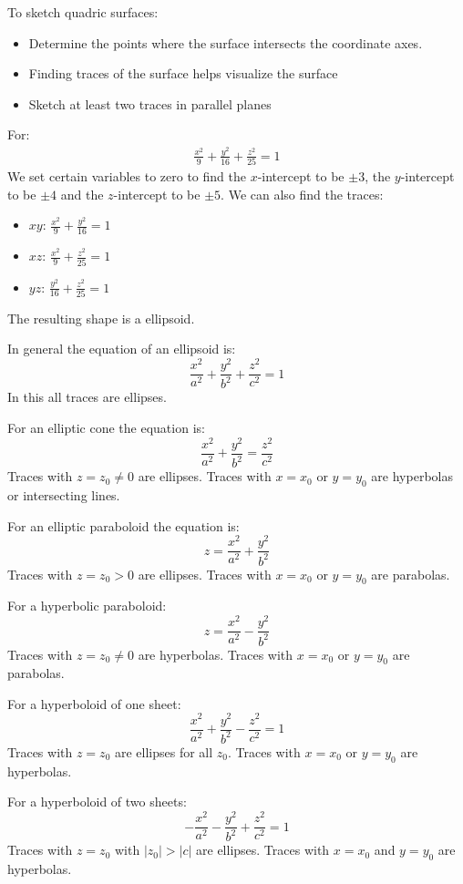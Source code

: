 \documentclass[../calc3.tex]{subfiles}
\begin{document}
To sketch quadric surfaces:
\begin{itemize}
    \item Determine the points where the surface intersects the coordinate axes. 
    \item Finding traces of the surface helps visualize the surface
    \item Sketch at least two traces in parallel planes
\end{itemize}
\begin{example}
    For:
    \begin{align*}
        \frac{x^2}{9}+\frac{y^2}{16}+\frac{z^2}{25}=1
    \end{align*}
    We set certain variables to zero to find the $x$-intercept to be $\pm 3$, the $y$-intercept to be $\pm 4$ and the $z$-intercept to be $\pm 5$.
    \smallbreak
    We can also find the traces:
    \begin{itemize}
        \item $xy$: $\frac{x^2}{9}+\frac{y^2}{16}=1$
        \item $xz$: $\frac{x^2}{9}+\frac{z^2}{25}=1$
        \item $yz$: $\frac{y^2}{16}+\frac{z^2}{25}=1$
    \end{itemize}
    The resulting shape is a ellipsoid.
\end{example}
In general the equation of an ellipsoid is:
\[\frac{x^2}{a^2}+\frac{y^2}{b^2}+\frac{z^2}{c^2}=1\]
In this all traces are ellipses.

For an elliptic cone the equation is:
\[\frac{x^2}{a^2}+\frac{y^2}{b^2}=\frac{z^2}{c^2}\]
Traces with $z = z_0 \neq 0$ are ellipses. Traces with $x=x_0$ or $y=y_0$ are hyperbolas or intersecting lines.

For an elliptic paraboloid the equation is:
\[z=\frac{x^2}{a^2}+\frac{y^2}{b^2}\]
Traces with $z=z_0>0$ are ellipses. Traces with $x=x_0$ or $y=y_0$ are parabolas.

For a hyperbolic paraboloid:
\[z=\frac{x^2}{a^2}-\frac{y^2}{b^2}\]
Traces with $z=z_0\neq 0$ are hyperbolas. Traces with $x=x_0$ or $y=y_0$ are parabolas.

For a hyperboloid of one sheet:
\[\frac{x^2}{a^2}+\frac{y^2}{b^2}-\frac{z^2}{c^2}=1\]
Traces with $z=z_0$ are ellipses for all $z_0$. Traces with $x=x_0$ or $y=y_0$ are hyperbolas.

For a hyperboloid of two sheets:
\[-\frac{x^2}{a^2}-\frac{y^2}{b^2}+\frac{z^2}{c^2}=1\]
Traces with $z=z_0$ with $|z_0|>|c|$ are ellipses. Traces with $x=x_0$ and $y=y_0$ are hyperbolas.
\end{document}
